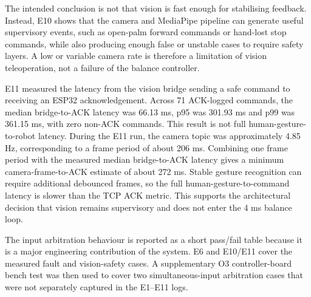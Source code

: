 \documentclass[12pt, a4paper]{article}
\begin{document}
The intended conclusion is not that vision is fast enough for stabilising feedback. Instead, E10 shows that the camera and MediaPipe pipeline can generate useful supervisory events, such as open-palm forward commands or hand-lost stop commands, while also producing enough false or unstable cases to require safety layers. A low or variable camera rate is therefore a limitation of vision teleoperation, not a failure of the balance controller.

E11 measured the latency from the vision bridge sending a safe command to receiving an ESP32 acknowledgement. Across 71 ACK-logged commands, the median bridge-to-ACK latency was 66.13 ms, p95 was 301.93 ms and p99 was 361.15 ms, with zero non-ACK commands. This result is not full human-gesture-to-robot latency. During the E11 run, the camera topic was approximately 4.85 Hz, corresponding to a frame period of about 206 ms. Combining one frame period with the measured median bridge-to-ACK latency gives a minimum camera-frame-to-ACK estimate of about 272 ms. Stable gesture recognition can require additional debounced frames, so the full human-gesture-to-command latency is slower than the TCP ACK metric. This supports the architectural decision that vision remains supervisory and does not enter the 4 ms balance loop.

The input arbitration behaviour is reported as a short pass/fail table because it is a major engineering contribution of the system. E6 and E10/E11 cover the measured fault and vision-safety cases. A supplementary O3 controller-board bench test was then used to cover two simultaneous-input arbitration cases that were not separately captured in the E1--E11 logs.
\end{document}
